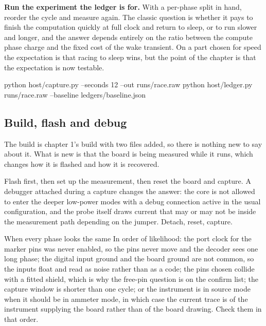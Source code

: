 \begin{steps}
\item \textbf{Run the experiment the ledger is for.} With a per-phase split in
hand, reorder the cycle and measure again. The classic question is whether it
pays to finish the computation quickly at full clock and return to sleep, or to
run slower and longer, and the answer depends entirely on the ratio between the
compute phase charge and the fixed cost of the wake transient. On a part chosen
for speed the expectation is that racing to sleep wins, but the point of the
chapter is that the expectation is now testable.
\begin{shellcode}
python host/capture.py --seconds 12 --out runs/race.raw
python host/ledger.py runs/race.raw --baseline ledgers/baseline.json
\end{shellcode}
\end{steps}

\subsection*{Build, flash and debug}


The build is chapter 1's build with two files added, so there is nothing new to
say about it. What is new is that the board is being measured while it runs,
which changes how it is flashed and how it is recovered.


Flash first, then set up the measurement, then reset the board and capture. A
debugger attached during a capture changes the answer: the core is not allowed
to enter the deeper low-power modes with a debug connection active in the usual
configuration, and the probe itself draws current that may or may not be inside
the measurement path depending on the jumper. Detach, reset, capture.

\begin{note}{When every phase looks the same}
In order of likelihood: the port clock for the marker pins was never enabled, so
the pins never move and the decoder sees one long phase; the digital input
ground and the board ground are not common, so the inputs float and read as
noise rather than as a code; the pins chosen collide with a fitted shield, which
is why the free-pin question is on the confirm list; the capture window is
shorter than one cycle; or the instrument is in source mode when it should be in
ammeter mode, in which case the current trace is of the instrument supplying the
board rather than of the board drawing. Check them in that order.
\end{note}

